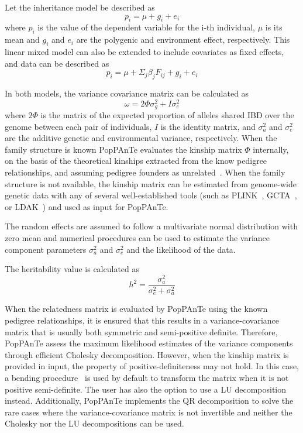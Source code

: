 \documentclass[a4paper,9pt]{article}
\begin{document}
\noindent
Let the inheritance model be described as
\[
p_i = \mu + g_i +e_i			
\]
where $p_i$  is the value of the dependent variable for the i-th individual, $\mu$ is its mean and $g_i$ and $e_i$  are  the polygenic and environment effect, respectively. 
%
This linear mixed model can also be extended to include covariates as fixed effects, and data can be described as
\[
p_i = \mu + \Sigma_j \beta_j F_{ij} + g_i + e_i
\]

\newpage

\noindent
In both models, the variance covariance matrix can be calculated as
\[
                        \omega = 2\Phi\sigma_g^2 + I\sigma_e^2   			                
\]						
where $2\Phi$ is the matrix of the expected proportion of alleles shared IBD over the genome between each pair of individuals, $I$ is the identity matrix, and $\sigma_a^2$ and $\sigma_e^2$  are the additive genetic and environmental variance, respectively.  When the family structure is known PopPAnTe evaluates the kinship matrix $\Phi$ internally, on the basis of the theoretical kinships extracted from the know pedigree relationships, and assuming pedigree founders as unrelated~\cite{kinship}. When the family structure is not available, the kinship matrix can be estimated from genome-wide genetic data with any of several well-established tools (such as PLINK~\cite{plink}, GCTA~\cite{gcta}, or LDAK~\cite{ldak}) and used as input for PopPAnTe.

\noindent
The random effects are assumed to follow a multivariate normal distribution with zero mean and numerical procedures can be used to estimate the variance component parameters $\sigma_a^2$ and $\sigma_e^2$ and the likelihood of the data.

\vspace{0.3cm}

\noindent
The heritability value is calculated as
\[
h^2 = \frac{\sigma_a^2}{\sigma_e^2  + \sigma_a^2}
\]

\vspace{0.3cm}

\noindent
When the relatedness matrix is evaluated by PopPAnTe using the known pedigree relationships, it is ensured that this results in a variance-covariance matrix that is usually both symmetric and semi-positive definite. Therefore, PopPAnTe assess the maximum likelihood estimates of the variance components through efficient Cholesky decomposition. However, when the kinship matrix is provided in input, the  property of positive-definiteness may not hold. In this case, a bending procedure~\cite{bending} is used by default to transform the matrix when it is not positive semi-definite. The user has also the option to use a LU decomposition instead. Additionally, PopPAnTe implements the QR decomposition to solve the rare cases where the variance-covariance matrix is not invertible and neither the Cholesky nor the LU decompositions can be used.
\end{document}
